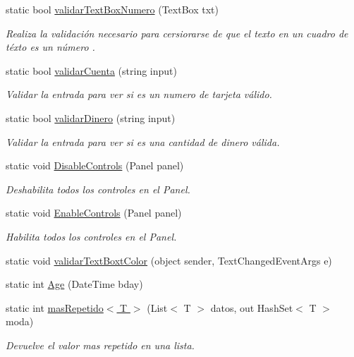 \begin{DoxyCompactItemize}
static bool \hyperlink{class_proyecto___integrador__3_1_1_helpers_aec73f44f21b6083802bdb77128435771}{validar\-Text\-Box\-Numero} (Text\-Box txt)
\begin{DoxyCompactList}\small\item\em Realiza la validación necesario para cersiorarse de que el texto en un cuadro de téxto es un número . \end{DoxyCompactList}\item 
static bool \hyperlink{class_proyecto___integrador__3_1_1_helpers_ab0cb9ffb08e0c4d6dd3c95852411fdec}{validar\-Cuenta} (string input)
\begin{DoxyCompactList}\small\item\em Validar la entrada para ver si es un numero de tarjeta válido. \end{DoxyCompactList}\item 
static bool \hyperlink{class_proyecto___integrador__3_1_1_helpers_a36afc3d70450850731fc7b24735e9342}{validar\-Dinero} (string input)
\begin{DoxyCompactList}\small\item\em Validar la entrada para ver si es una cantidad de dinero válida. \end{DoxyCompactList}\item 
static void \hyperlink{class_proyecto___integrador__3_1_1_helpers_a7724b85162da445ab1ff1e54cf0974f2}{Disable\-Controls} (Panel panel)
\begin{DoxyCompactList}\small\item\em Deshabilita todos los controles en el Panel. \end{DoxyCompactList}\item 
static void \hyperlink{class_proyecto___integrador__3_1_1_helpers_abf9eb7a688a873f0767ce5dc5bd6f5af}{Enable\-Controls} (Panel panel)
\begin{DoxyCompactList}\small\item\em Habilita todos los controles en el Panel. \end{DoxyCompactList}\item 
static void \hyperlink{class_proyecto___integrador__3_1_1_helpers_afc8b1c92d8b5e218247f0295580dea13}{validar\-Text\-Boxt\-Color} (object sender, Text\-Changed\-Event\-Args e)
\item 
static int \hyperlink{class_proyecto___integrador__3_1_1_helpers_af0574bab82d761e6432dfae128e68a6c}{Age} (Date\-Time bday)
\item 
static int \hyperlink{class_proyecto___integrador__3_1_1_helpers_a6bc9de476926295b0feb8f636cc39f31}{mas\-Repetido$<$ T $>$} (List$<$ T $>$ datos, out Hash\-Set$<$ T $>$ moda)
\begin{DoxyCompactList}\small\item\em Devuelve el valor mas repetido en una lista. \end{DoxyCompactList}\end{DoxyCompactItemize}



